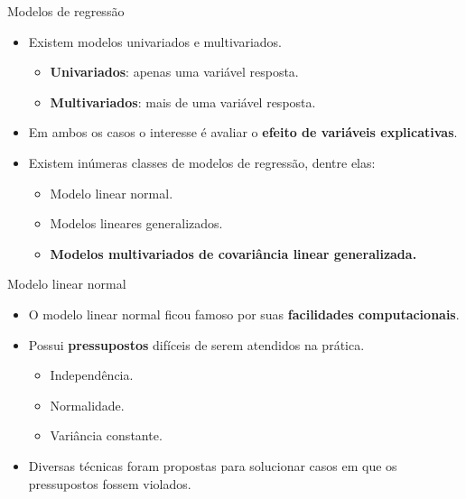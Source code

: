\documentclass[
  ignorenonframetext,
  serif,
  professionalfont,
  usenames,
  dvipsnames,
  aspectratio = 169]{beamer}
\begin{document}
\begin{frame}{Modelos de regressão}
\protect\hypertarget{modelos-de-regressuxe3o-6}{}
\begin{itemize}
    \itemsep 2ex

  \item Existem modelos univariados e multivariados. 
  
    \begin{itemize}
      \item \textbf{Univariados}: apenas uma variável resposta.
      \item \textbf{Multivariados}: mais de uma variável resposta.
    \end{itemize}

  \item Em ambos os casos o interesse é avaliar o \textbf{efeito de variáveis explicativas}.
  
  \item Existem inúmeras classes de modelos de regressão, dentre elas: 
  \begin{itemize}
  \item Modelo linear normal.
  \item Modelos lineares generalizados.
  \item \textbf{Modelos multivariados de covariância linear generalizada.}
\end{itemize}

  \end{itemize}
\end{frame}

\begin{frame}{Modelo linear normal}
\protect\hypertarget{modelo-linear-normal}{}
\begin{itemize}
    \itemsep 2ex

  \item O modelo linear normal \citep{galton} ficou famoso por suas \textbf{facilidades computacionais}. 
  
  \item Possui \textbf{pressupostos} difíceis de serem atendidos na prática.
    \begin{itemize}
      \item Independência.
      \item Normalidade.
      \item Variância constante.
    \end{itemize}
  
  \item Diversas técnicas foram propostas para solucionar casos em que os pressupostos fossem violados.
  
  \end{itemize}
\end{frame}
\end{document}
